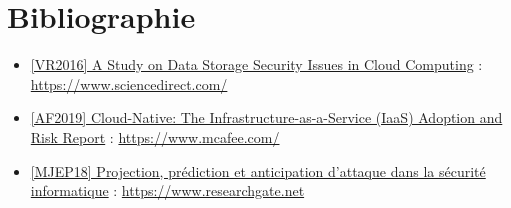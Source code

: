 \documentclass[a4paper, 12pt]{article}
\begin{document}
  \section{Bibliographie}
    \begin{itemize}
      \item \href{https://www.sciencedirect.com/science/article/pii/S1877050916315812}{[VR2016] A Study on Data Storage Security Issues in Cloud Computing} : \url{https://www.sciencedirect.com/}
      \item \href{https://www.mcafee.com/enterprise/en-us/assets/reports/restricted/rp-cloud-adoption-risk-report-iaas.pdf}{[AF2019] Cloud-Native: The Infrastructure-as-a-Service (IaaS) Adoption and Risk Report} : \url{https://www.mcafee.com/}
      \item \href{https://www.researchgate.net/publication/327449459_Survey_of_Attack_Projection_Prediction_and_Forecasting_in_Cyber_Security}{[MJEP18] Projection, prédiction et anticipation d'attaque dans la sécurité informatique} : \url{https://www.researchgate.net}
    \end{itemize}
\end{document}
